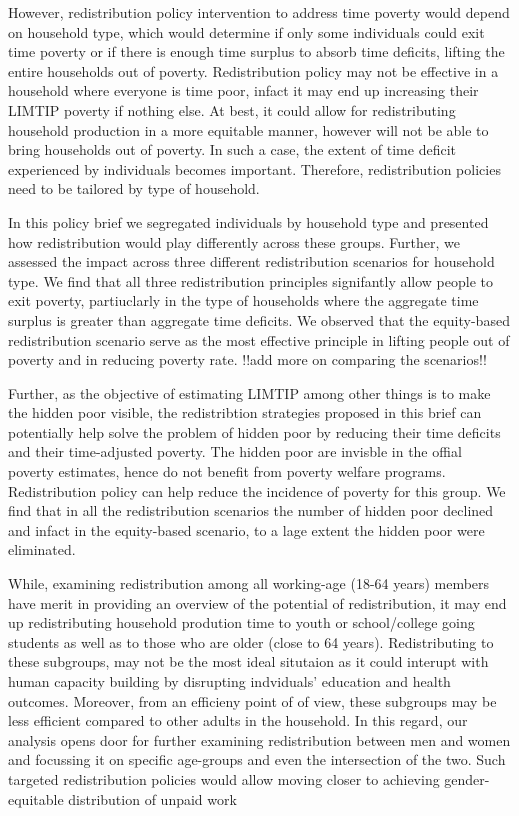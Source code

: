 \documentclass[
  11pt,
]{article}
\begin{document}
However, redistribution policy intervention to address time poverty
would depend on household type, which would determine if only some
individuals could exit time poverty or if there is enough time surplus
to absorb time deficits, lifting the entire households out of poverty.
Redistribution policy may not be effective in a household where everyone
is time poor, infact it may end up increasing their LIMTIP poverty if
nothing else. At best, it could allow for redistributing household
production in a more equitable manner, however will not be able to bring
households out of poverty. In such a case, the extent of time deficit
experienced by individuals becomes important. Therefore, redistribution
policies need to be tailored by type of household.

In this policy brief we segregated individuals by household type and
presented how redistribution would play differently across these groups.
Further, we assessed the impact across three different redistribution
scenarios for household type. We find that all three redistribution
principles signifantly allow people to exit poverty, partiuclarly in the
type of households where the aggregate time surplus is greater than
aggregate time deficits. We observed that the equity-based
redistribution scenario serve as the most effective principle in lifting
people out of poverty and in reducing poverty rate. !!add more on
comparing the scenarios!!

Further, as the objective of estimating LIMTIP among other things is to
make the hidden poor visible, the redistribtion strategies proposed in
this brief can potentially help solve the problem of hidden poor by
reducing their time deficits and their time-adjusted poverty. The hidden
poor are invisble in the offial poverty estimates, hence do not benefit
from poverty welfare programs. Redistribution policy can help reduce the
incidence of poverty for this group. We find that in all the
redistribution scenarios the number of hidden poor declined and infact
in the equity-based scenario, to a lage extent the hidden poor were
eliminated.

While, examining redistribution among all working-age (18-64 years)
members have merit in providing an overview of the potential of
redistribution, it may end up redistributing household prodution time to
youth or school/college going students as well as to those who are older
(close to 64 years). Redistributing to these subgroups, may not be the
most ideal situtaion as it could interupt with human capacity building
by disrupting indviduals' education and health outcomes. Moreover, from
an efficieny point of of view, these subgroups may be less efficient
compared to other adults in the household. In this regard, our analysis
opens door for further examining redistribution between men and women
and focussing it on specific age-groups and even the intersection of the
two. Such targeted redistribution policies would allow moving closer to
achieving gender-equitable distribution of unpaid work
\end{document}
